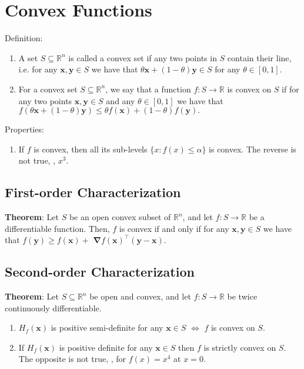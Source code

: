 \section{Convex Functions}

Definition:
\begin{enumerate}
    \item  A set $S \subseteq \mathbb{R}^{n}$ is called a convex set if any two points in $S$ contain their line, i.e. for any $\boldsymbol{x}, \boldsymbol{y} \in S$ we have that $\theta \boldsymbol{x}+(1-\theta) \boldsymbol{y} \in S$ for any $\theta \in[0,1]$.
    \item For a convex set $S \subseteq \mathbb{R}^{n}$, we say that a function $f: S \rightarrow \mathbb{R}$ is convex on $S$ if for any two points $\boldsymbol{x}, \boldsymbol{y} \in S$ and any $\theta \in[0,1]$ we have that
    $
    f(\theta \boldsymbol{x}+(1-\theta) \boldsymbol{y}) \leq \theta f(\boldsymbol{x})+(1-\theta) f(\boldsymbol{y}).
    $
\end{enumerate}

Properties:
\begin{enumerate}
    \item If $f$ is convex, then all its sub-levels $\{x: f(x)\le \alpha\}$ is convex. The reverse is not true, \eg, $x^3$.
\end{enumerate}

\subsection{First-order Characterization}
\textbf{Theorem}:
Let $S$ be an open convex subset of $\mathbb{R}^{n}$, and let $f: S \rightarrow \mathbb{R}$ be a differentiable function. Then, $f$ is convex if and only if for any $\boldsymbol{x}, \boldsymbol{y} \in S$ we have that $f(\boldsymbol{y}) \geq f(\boldsymbol{x})+$ $\boldsymbol{\nabla} f(\boldsymbol{x})^{\top}(\boldsymbol{y}-\boldsymbol{x}) .$

\subsection{Second-order Characterization}
\textbf{Theorem}:
Let $S \subseteq \mathbb{R}^{n}$ be open and convex, and let $f: S \rightarrow \mathbb{R}$ be twice continuously differentiable.
\begin{enumerate}
    \item $H_{f}(\boldsymbol{x})$ is positive semi-definite for any $\boldsymbol{x} \in S$ $\Leftrightarrow$ $f$ is convex on $S$.
    \item If $H_{f}(\boldsymbol{x})$ is positive definite for any $\boldsymbol{x} \in S$ then $f$ is strictly convex on $S$. The opposite is not true, \eg, for $f(x)=x^4$ at $x=0$.
\end{enumerate}

